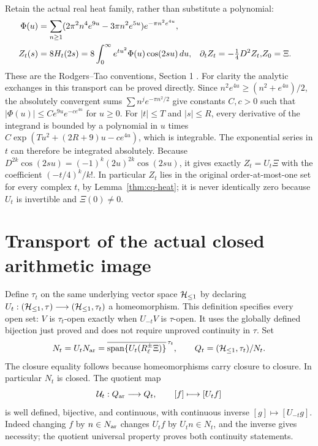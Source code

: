Retain the actual real heat family, rather than substitute a polynomial:
\begin{align}\label{eq:cq-realheat}
 \Phi(u)&=\sum_{n\geq1}
 (2\pi^2n^4e^{9u}-3\pi n^2e^{5u})e^{-\pi n^2e^{4u}},\notag\\
 Z_t(s)&=8H_t(2s)=8\int_0^\infty e^{tu^2}\Phi(u)\cos(2su)\,du,
 &\partial_tZ_t=-\tfrac14D^2Z_t,
 &Z_0=\Xi.
\end{align}
These are the Rodgers--Tao conventions, Section 1 \cite{cqRT}.
For clarity the analytic exchanges in this transport can be proved
directly. Since $n^2e^{4u}\geq(n^2+e^{4u})/2$, the absolutely
convergent sums $\sum n^je^{-\pi n^2/2}$ give constants $C,c>0$
such that $|\Phi(u)|\leq Ce^{9u}e^{-ce^{4u}}$ for $u\geq0$.
For $|t|\leq T$ and $|s|\leq R$, every derivative of the integrand
is bounded by a polynomial in $u$ times
$C\exp(Tu^2+(2R+9)u-ce^{4u})$, which is integrable.
The exponential series in $t$ can therefore be integrated absolutely.
Because $D^{2k}\cos(2su)=(-1)^k(2u)^{2k}\cos(2su)$, it gives
exactly $Z_t=U_t\Xi$ with the coefficient $(-t/4)^k/k!$.
In particular $Z_t$ lies in the original order-at-most-one set for
every complex $t$, by Lemma~\ref{thm:cq-heat}; it is never identically
zero because $U_t$ is invertible and $\Xi(0)\ne0$.

\section{Transport of the actual closed arithmetic image}
\label{sec:cq-moving}
Define $\tau_t$ on the same underlying vector space $\mathcal H_{\leq 1}$ by
declaring $U_t:(\mathcal H_{\leq 1},\tau)\longrightarrow(\mathcal H_{\leq 1},\tau_t)$ a
homeomorphism. This definition specifies every open set:
$V$ is $\tau_t$-open exactly when $U_{-t}V$ is $\tau$-open.
It uses the globally defined bijection just proved and does not require
unproved continuity in $\tau$. Set
\begin{equation}\label{eq:cq-Qt}
 N_t=U_tN_{\rm ar}
 =\overline{\operatorname{span}\{U_t(R_\ell^\pm\Xi)\}}^{\,\tau_t},
 \qquad Q_t=(\mathcal H_{\leq 1},\tau_t)/N_t.
\end{equation}
The closure equality follows because homeomorphisms carry closure to
closure. In particular $N_t$ is closed. The quotient map
\begin{equation}\label{eq:cq-Phi}
 \mathcal U_t:Q_{\rm ar}\longrightarrow Q_t,\qquad [f]\longmapsto[U_tf]
\end{equation}
is well defined, bijective, and continuous, with continuous inverse
$[g]\mapsto[U_{-t}g]$. Indeed changing $f$ by $n\in N_{\rm ar}$
changes $U_tf$ by $U_tn\in N_t$, and the inverse gives necessity;
the quotient universal property proves both continuity statements.


